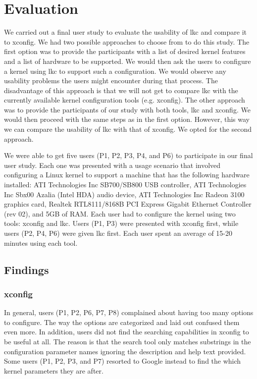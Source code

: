 \documentclass{chi2009}
\begin{document}
\section{Evaluation}\label{sec:evaluation}
We carried out a final user study to evaluate the usability of \textsf{lkc} and compare it to \textsf{xconfig}. We had two possible approaches to choose from to
do this study. The first option was to provide the participants with a list of desired kernel features and a list of hardware to be supported. We would then ask
the users to configure a kernel using \textsf{lkc} to support such a configuration. We would observe any usability problems the users might encounter during
that process. The disadvantage of this approach is that we will not get to compare \textsf{lkc} with the currently available kernel configuration tools (e.g.
\textsf{xconfig}). The other approach was to provide the participants of our study with both tools, \textsf{lkc} and \textsf{xconfig}. We would then proceed
with the same steps as in the first option. However, this way we can compare the usability of \textsf{lkc} with that of \textsf{xconfig}. We opted for the
second approach.

We were able to get five users (P1, P2, P3, P4, and P6) to participate in our final user study. Each one was presented with a usage scenario that involved
configuring a Linux kernel to support a machine that has the following hardware installed: ATI Technologies Inc SB700/SB800 USB controller, ATI Technologies Inc
Sbx00 Azalia (Intel HDA) audio device, ATI Technologies Inc Radeon 3100 graphics card, Realtek RTL8111/8168B PCI Express Gigabit Ethernet Controller (rev 02),
and 5GB of RAM. Each user had to configure the kernel using two tools: \textsf{xconfig} and \textsf{lkc}. Users (P1, P3) were presented with \textsf{xconfig}
first, while users (P2, P4, P6) were given \textsf{lkc} first. Each user spent an average of 15-20 minutes using each tool.

\subsection{Findings}
\subsubsection{\textsf{xconfig}}
In general, users (P1, P2, P6, P7, P8) complained about having too many options to configure. The way the options are categorized and laid out confused them
even more. In addition, users did not find the searching capabilities in \textsf{xconfig} to be useful at all. The reason is that the search tool only matches
substrings in the configuration parameter names ignoring the description and help text provided. Some users (P1, P2, P3, and P7) resorted to Google instead to
find the which kernel parameters they are after.
\end{document}
